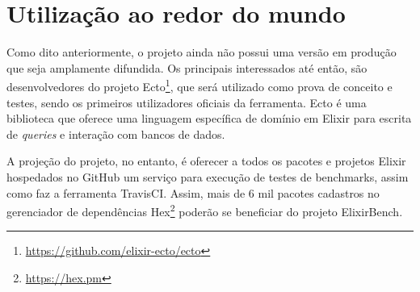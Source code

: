 \section{Utilização ao redor do mundo}

 Como dito anteriormente, o projeto ainda não possui uma versão em produção que
 seja amplamente difundida. Os principais interessados até então, são desenvolvedores
 do projeto Ecto\footnote{\url{https://github.com/elixir-ecto/ecto}}, que será
 utilizado como prova de conceito e testes, sendo os primeiros utilizadores
 oficiais da ferramenta. Ecto é uma biblioteca que oferece uma linguagem específica
 de domínio em Elixir para escrita de \textit{queries} e interação com bancos de dados.

 A projeção do projeto, no entanto, é oferecer a todos os pacotes e projetos Elixir hospedados
 no GitHub um serviço para execução de testes de benchmarks, assim como faz a ferramenta
 TravisCI. Assim, mais de 6 mil pacotes cadastros no gerenciador de dependências
 Hex\footnote{\url{https://hex.pm}} poderão se beneficiar do projeto ElixirBench.
